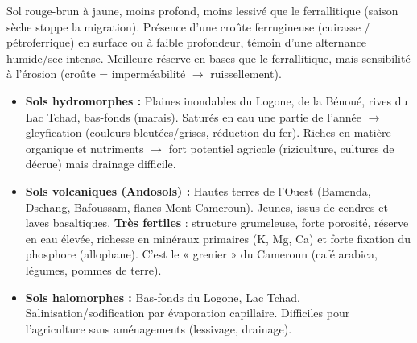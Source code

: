 \documentclass[11pt]{article}
\newcommand{\cle}[1]{{\popxbold\color{popdark}#1}}
\begin{document}
\begin{definition}
Sol rouge-brun à jaune, moins profond, moins lessivé que le ferrallitique (saison sèche stoppe la migration). Présence d'une \cle{croûte ferrugineuse} (cuirasse / pétroferrique) en surface ou à faible profondeur, témoin d'une alternance humide/sec intense. Meilleure réserve en bases que le ferrallitique, mais sensibilité à l'érosion (croûte = imperméabilité $\rightarrow$ ruissellement).
\end{definition}

\begin{itemize}
    \item \textbf{Sols hydromorphes :} Plaines inondables du Logone, de la Bénoué, rives du Lac Tchad, bas-fonds (marais). Saturés en eau une partie de l'année $\rightarrow$ gleyfication (couleurs bleutées/grises, réduction du fer). Riches en matière organique et nutriments $\rightarrow$ fort potentiel agricole (riziculture, cultures de décrue) mais drainage difficile.
    \item \textbf{Sols volcaniques (Andosols) :} Hautes terres de l'Ouest (Bamenda, Dschang, Bafoussam, flancs Mont Cameroun). Jeunes, issus de cendres et laves basaltiques. \textbf{Très fertiles} : structure grumeleuse, forte porosité, réserve en eau élevée, richesse en minéraux primaires (K, Mg, Ca) et forte fixation du phosphore (allophane). C'est le « grenier » du Cameroun (café arabica, légumes, pommes de terre).
    \item \textbf{Sols halomorphes :} Bas-fonds du Logone, Lac Tchad. Salinisation/sodification par évaporation capillaire. Difficiles pour l'agriculture sans aménagements (lessivage, drainage).
\end{itemize}
\end{document}
